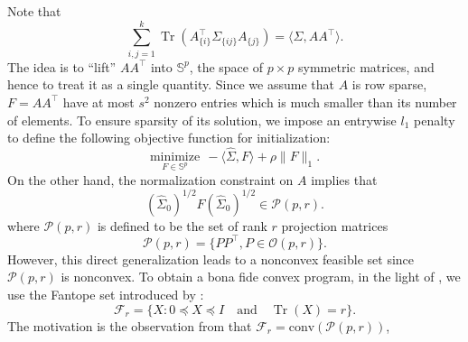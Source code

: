 \documentclass[11pt]{article}
\newcommand{\nb}[1]{\textcolor{orange}{\texttt{[#1]}}}
\newcommand{\red}{\color{red}}
\newcommand{\dc}[1]{\{#1\}} %
\DeclareMathOperator{\Tr}{Tr}
\newcommand{\0}{{\mathbf{0}}}
\newcommand{\sfirst}{{\widehat{\Sigma}}}
\newcommand{\szerofirst}{{\widehat{\Sigma}_0}}
\begin{document}
Note that 
\begin{equation*}
    \sum_{i,j=1}^k \Tr(A_{\dc{i}}^\top\Sigma_{\dc{ij}}A_{\dc{j}}) 
      =\langle \Sigma,AA^\top \rangle.
\end{equation*}
The idea is to ``lift'' $AA^\top $ into $\mathbb{S}^p$, the space of $p\times p$ symmetric matrices, and hence to treat it as a single quantity. 
Since we assume that $A$ is row sparse, $F=AA^\top $ have at most $s^2$ nonzero entries which is much smaller than its number of elements. 
To ensure sparsity of its solution,
we impose an entrywise $l_1$ penalty to define the following objective function for initialization:
\begin{equation*}
   \underset{F\in \mathbb{S}^{p}}{\text{minimize}} ~~-\langle \sfirst,F\rangle+\rho \|F\|_{1}.
\end{equation*}
On the other hand, the normalization constraint on $A$ implies that
\begin{equation*}
    (\szerofirst)^{1/2}F(\szerofirst)^{1/2}\in \mathcal{P}(p,r).
\end{equation*} 
where 
$\mathcal{P}(p,r)$ is defined to be the set of rank $r$ projection matrices
\begin{equation*}
    \mathcal{P}(p,r)=\{PP^\top , P\in \mathcal{O}(p,r)\}.
\end{equation*} 
However, this direct generalization leads to a nonconvex feasible set since $\mathcal{P}(p,r)$ is nonconvex.
To obtain a bona fide convex program,
in the light of \cite{vu2013fantope}, we use the Fantope set introduced by \cite{dattorroconvex}: 
\begin{equation*}
    \mathcal{F}_r=\{X:0\preceq X\preceq I \quad\text{and}\quad \Tr{(X)}=r\}.
\end{equation*}
The motivation is the observation from \cite{maxeigenvalue}  that
$\mathcal{F}_r=\text{conv}(\mathcal{P}(p,r))$,
\end{document}
